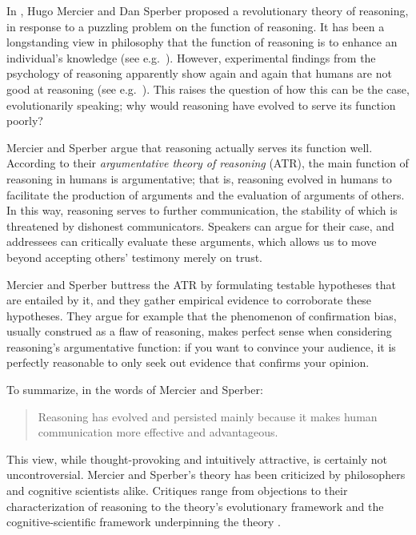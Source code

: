
In \citeyear{MS11}, Hugo Mercier and Dan Sperber proposed a revolutionary
theory of reasoning, in response to a puzzling problem on the function of reasoning.
It has been a longstanding view in philosophy that the function of reasoning is to enhance an individual's knowledge (see e.g.~). However, experimental findings from the psychology of reasoning apparently show again and again that humans are not good at reasoning (see e.g.~\citet{Tversky83}). This raises the question of how this can be the case, evolutionarily speaking; why would reasoning have evolved to serve its function poorly?

Mercier and Sperber argue that reasoning actually serves its function well.
According to their \emph{argumentative theory of reasoning} (ATR), the main function of reasoning in humans is argumentative; that is, reasoning evolved in humans to facilitate the production of arguments and the evaluation of arguments of others. In this way, reasoning serves to further communication, the stability of which is threatened by dishonest communicators. Speakers can argue for their case, and addressees can critically evaluate these arguments, which allows us to move beyond accepting others' testimony merely on trust.

Mercier and Sperber buttress the ATR by formulating testable hypotheses that are entailed by it, and they gather empirical evidence to corroborate these hypotheses. They argue for example that the phenomenon of confirmation bias, usually construed as a flaw of reasoning, makes perfect sense when considering reasoning's argumentative function: if you want to convince your audience, it is perfectly reasonable to only seek out evidence that confirms your opinion.

To summarize, in the words of Mercier and Sperber:
\begin{quote}
    Reasoning has evolved and persisted mainly because it makes human communication more effective and advantageous.
    \citep[p.~60]{MS11}
\end{quote}

This view, while thought-provoking and intuitively attractive, is certainly not uncontroversial. Mercier and Sperber's theory has been criticized by philosophers and cognitive scientists alike. Critiques range from objections to their characterization of reasoning \citep{Koren23} to the theory's evolutionary framework \citep{Novaes18} and the cognitive-scientific framework underpinning the theory \citep{Sterelny18, Chater18}.


